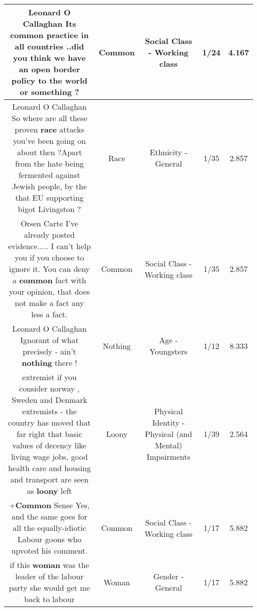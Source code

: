 \documentclass[11pt]{article}
\newlength\mylength
\begin{document}
\begin{center}
\begin{longtable}{|C{.65\mylength}|C{.30\mylength}|C{.12\mylength}|C{.12\mylength}|C{.12\mylength}|}
  \small Leonard O Callaghan    Its \textbf{common} practice in all countries ..did you think we have an open border policy to the world or something ?\normalsize   & Common & Social Class - Working class & 1/24 & 4.167 \\  \hline
  \small Leonard O Callaghan So where are all these proven \textbf{race} attacks you've been going on about then ?Apart from the hate being fermented against Jewish people, by the that EU supporting bigot Livingston ?\normalsize   & Race & Ethnicity - General & 1/35 & 2.857 \\  \hline
  \small Orsen Carte I've already posted evidence..... I can't help you if you choose to ignore it. You can deny a \textbf{common} fact with your opinion, that does not make a fact any less a fact.\normalsize   & Common & Social Class - Working class & 1/35 & 2.857 \\  \hline
  \small Leonard O Callaghan Ignorant of what precisely - ain't \textbf{nothing} there !\normalsize   & Nothing & Age - Youngsters & 1/12 & 8.333 \\  \hline
  \small extremist if you consider norway , Sweden and Denmark extremists - the country has moved that far right that basic values of decency like living wage jobs, good health care and housing and transport are seen as \textbf{loony} left\normalsize   & Loony & Physical Identity - Physical (and Mental) Impairments & 1/39 & 2.564 \\  \hline
  \small +\textbf{Common} Sense  Yes, and the same goes for all the equally-idiotic Labour goons who upvoted his comment.\normalsize   & Common & Social Class - Working class & 1/17 & 5.882 \\  \hline
  \small if this \textbf{woman} was the leader of the labour party she would get me back to labour\normalsize   & Woman & Gender - General & 1/17 & 5.882 \\  \hline

\end{longtable}
\end{center}
\end{document}
